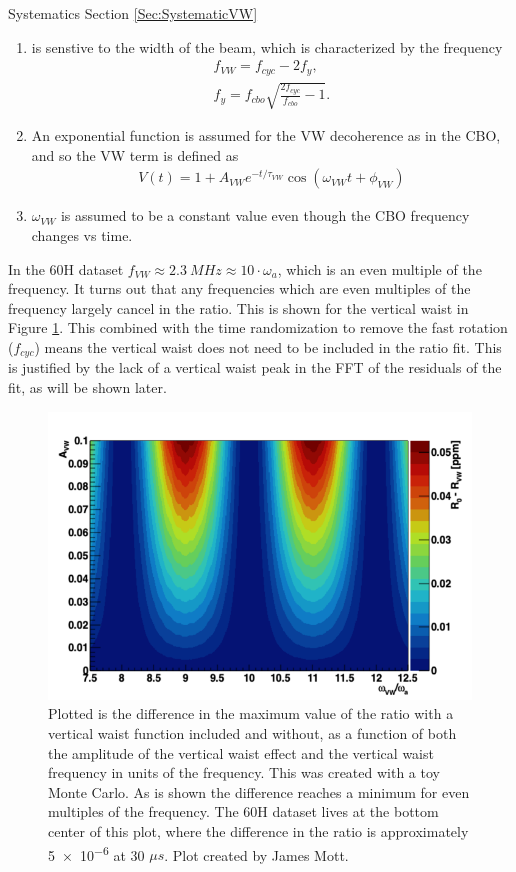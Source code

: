 	\noindent Systematics Section \ref{Sec:SystematicVW}

	\begin{enumerate}
		\item{\wa is senstive to the width of the beam, which is characterized by the frequency 
			\begin{gather}
				f_{VW} = f_{cyc} - 2f_{y}, \\
				f_{y} = f_{cbo} \sqrt{\frac{2f_{cyc}}{f_{cbo}} - 1}.
			\end{gather}}
		\item{An exponential function is assumed for the VW decoherence as in the CBO, and so the VW term is defined as
			\begin{gather}
					V(t) = 1 + A_{VW} e^{-t/\tau_{VW}} \cos(\omega_{VW}t + \phi_{VW})
			\end{gather}
		}
		\item{$\omega_{VW}$ is assumed to be a constant value even though the CBO frequency changes vs time.}
	\end{enumerate}

	In the 60H dataset $f_{VW} \approx \SI{2.3}{MHz} \approx 10 \cdot \omega_{a}$, which is an even multiple of the \gmtwo frequency. It turns out that any frequencies which are even multiples of the \gmtwo frequency largely cancel in the ratio. This is shown for the vertical waist in Figure \ref{fig:VWPlot}. This combined with the time randomization to remove the fast rotation ($f_{cyc}$) means the vertical waist does not need to be included in the ratio fit. This is justified by the lack of a vertical waist peak in the FFT of the residuals of the fit, as will be shown later.

	\begin{figure}[]
		\centering
		\includegraphics[width=\textwidth]{VWPlot}
	    \caption[VWPlot]{Plotted is the difference in the maximum value of the ratio with a vertical waist function included and without, as a function of both the amplitude of the vertical waist effect and the vertical waist frequency in units of the \gmtwo frequency. This was created with a toy Monte Carlo. As is shown the difference reaches a minimum for even multiples of the \gmtwo frequency. The 60H dataset lives at the bottom center of this plot, where the difference in the ratio is approximately \SI{5e-6}{} at 30 $\mu s$. Plot created by James Mott.}
	    \label{fig:VWPlot}
	\end{figure}



